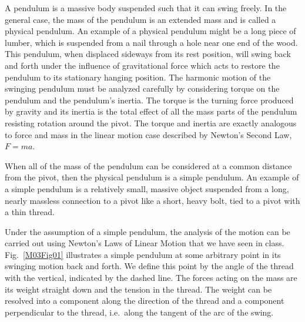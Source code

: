 A pendulum is a massive body suspended such that it can swing freely.  In the general case, the mass of the pendulum is an extended mass and is called a physical pendulum.  An example of a physical pendulum might be a long piece of lumber, which is suspended from a nail through a hole near one end of the wood. This pendulum, when displaced sideways from its rest position, will swing back and forth under the influence of gravitational force which acts to restore the pendulum to its stationary hanging position.  The harmonic motion of the swinging pendulum must be analyzed carefully by considering torque on the pendulum and the pendulum's inertia.  The torque is the turning force produced by gravity and its inertia is the total effect of all the mass parts of the pendulum resisting rotation around the pivot.  The torque and inertia are exactly analogous to force and mass in the linear motion case described by Newton's Second Law, $F = m a$.

When all of the mass of the pendulum can be considered at a common distance from the pivot, then the physical pendulum is a simple pendulum.  An example of a simple pendulum is a relatively small, massive object suspended from a long, nearly massless connection to a pivot like a short, heavy bolt, tied to a pivot with a thin thread.

Under the assumption of a simple pendulum, the analysis of the motion can be carried out using Newton's Laws of Linear Motion that we have seen in class.  Fig.~\ref{M03Fig01} illustrates a simple pendulum at some arbitrary point in its swinging motion back and forth.  We define this point by the angle of the thread with the vertical, indicated by the dashed line.  The forces acting on the mass are its weight straight down and the tension in the thread.  The weight can be resolved into a component along the direction of the thread and a component perpendicular to the thread, i.e.\ along the tangent of the arc of the swing.

